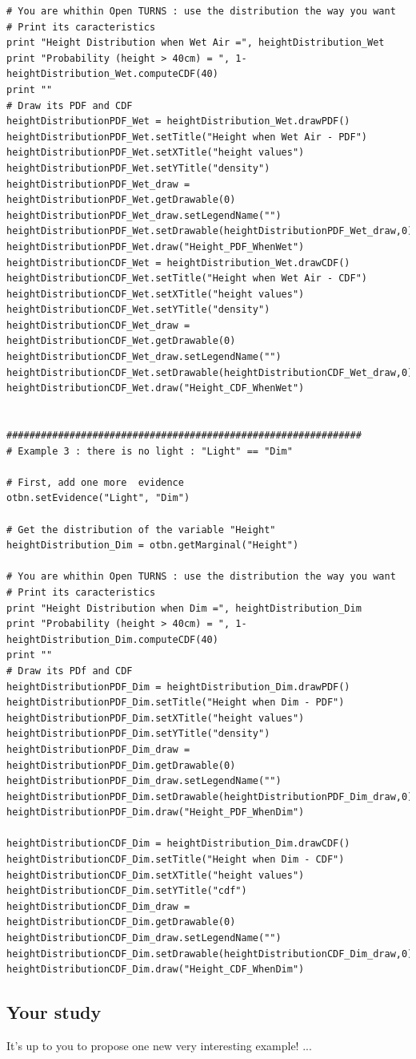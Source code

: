 \begin{lstlisting}
# You are whithin Open TURNS : use the distribution the way you want
# Print its caracteristics
print "Height Distribution when Wet Air =", heightDistribution_Wet
print "Probability (height > 40cm) = ", 1-heightDistribution_Wet.computeCDF(40)
print ""
# Draw its PDF and CDF
heightDistributionPDF_Wet = heightDistribution_Wet.drawPDF()
heightDistributionPDF_Wet.setTitle("Height when Wet Air - PDF")
heightDistributionPDF_Wet.setXTitle("height values")
heightDistributionPDF_Wet.setYTitle("density")
heightDistributionPDF_Wet_draw = heightDistributionPDF_Wet.getDrawable(0)
heightDistributionPDF_Wet_draw.setLegendName("")
heightDistributionPDF_Wet.setDrawable(heightDistributionPDF_Wet_draw,0)
heightDistributionPDF_Wet.draw("Height_PDF_WhenWet")
heightDistributionCDF_Wet = heightDistribution_Wet.drawCDF()
heightDistributionCDF_Wet.setTitle("Height when Wet Air - CDF")
heightDistributionCDF_Wet.setXTitle("height values")
heightDistributionCDF_Wet.setYTitle("density")
heightDistributionCDF_Wet_draw = heightDistributionCDF_Wet.getDrawable(0)
heightDistributionCDF_Wet_draw.setLegendName("")
heightDistributionCDF_Wet.setDrawable(heightDistributionCDF_Wet_draw,0)
heightDistributionCDF_Wet.draw("Height_CDF_WhenWet")


##############################################################
# Example 3 : there is no light : "Light" == "Dim"

# First, add one more  evidence
otbn.setEvidence("Light", "Dim")

# Get the distribution of the variable "Height"
heightDistribution_Dim = otbn.getMarginal("Height")

# You are whithin Open TURNS : use the distribution the way you want
# Print its caracteristics
print "Height Distribution when Dim =", heightDistribution_Dim
print "Probability (height > 40cm) = ", 1-heightDistribution_Dim.computeCDF(40)
print ""
# Draw its PDf and CDF
heightDistributionPDF_Dim = heightDistribution_Dim.drawPDF()
heightDistributionPDF_Dim.setTitle("Height when Dim - PDF")
heightDistributionPDF_Dim.setXTitle("height values")
heightDistributionPDF_Dim.setYTitle("density")
heightDistributionPDF_Dim_draw = heightDistributionPDF_Dim.getDrawable(0)
heightDistributionPDF_Dim_draw.setLegendName("")
heightDistributionPDF_Dim.setDrawable(heightDistributionPDF_Dim_draw,0)
heightDistributionPDF_Dim.draw("Height_PDF_WhenDim")

heightDistributionCDF_Dim = heightDistribution_Dim.drawCDF()
heightDistributionCDF_Dim.setTitle("Height when Dim - CDF")
heightDistributionCDF_Dim.setXTitle("height values")
heightDistributionCDF_Dim.setYTitle("cdf")
heightDistributionCDF_Dim_draw = heightDistributionCDF_Dim.getDrawable(0)
heightDistributionCDF_Dim_draw.setLegendName("")
heightDistributionCDF_Dim.setDrawable(heightDistributionCDF_Dim_draw,0)
heightDistributionCDF_Dim.draw("Height_CDF_WhenDim")
\end{lstlisting}









\newpage \subsection{Your study}

It's up to you to propose one new very interesting example! ...